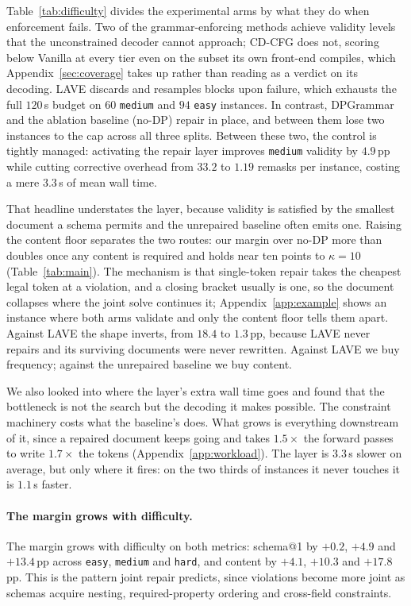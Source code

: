 \documentclass{article}
\begin{document}
Table~\ref{tab:difficulty} divides the experimental arms by what they do when enforcement fails. Two of the grammar-enforcing methods achieve validity levels that the unconstrained decoder cannot approach; CD-CFG does not, scoring below Vanilla at every tier even on the subset its own front-end compiles, which Appendix~\ref{sec:coverage} takes up rather than reading as a verdict on its decoding. LAVE discards and resamples blocks upon failure, which exhausts the full $120$\,s budget on $60$ \texttt{medium} and $94$ \texttt{easy} instances. In contrast, DPGrammar and the ablation baseline (no-DP) repair in place, and between them lose two instances to the cap across all three splits. Between these two, the control is tightly managed: activating the repair layer improves \texttt{medium} validity by $4.9$\,pp while cutting corrective overhead from $33.2$ to $1.19$ remasks per instance, costing a mere $3.3$\,s of mean wall time.

That headline understates the layer, because validity is satisfied by the
smallest document a schema permits and the unrepaired baseline often emits one.
Raising the content floor separates the two routes: our margin over no-DP more
than doubles once any content is required and holds near ten points to
$\kappa{=}10$ (Table~\ref{tab:main}). The mechanism is that single-token repair
takes the cheapest legal token at a violation, and a closing bracket usually is
one, so the document collapses where the joint solve continues it;
Appendix~\ref{app:example} shows an instance where both arms validate and only
the content floor tells them apart. Against LAVE the shape inverts, from
$18.4$ to $1.3$\,pp, because LAVE never repairs and its surviving documents were
never rewritten. Against LAVE we buy frequency; against the unrepaired baseline
we buy content.


We also looked into where the layer's extra wall time goes and found that the
bottleneck is not the search but the decoding it makes possible. The constraint
machinery costs what the baseline's does. What grows is everything downstream of
it, since a repaired document keeps going and takes $1.5\times$ the forward
passes to write $1.7\times$ the tokens (Appendix~\ref{app:workload}). The layer
is $3.3$\,s slower on average, but only where it fires: on the two thirds of
instances it never touches it is $1.1$\,s faster.

\paragraph{The margin grows with difficulty.}
The margin grows with difficulty on both metrics: schema@1 by $+0.2$, $+4.9$ and
$+13.4$\,pp across \texttt{easy}, \texttt{medium} and \texttt{hard}, and content
by $+4.1$, $+10.3$ and $+17.8$\,pp. This is the pattern joint repair predicts,
since violations become more joint as schemas acquire nesting, required-property
ordering and cross-field constraints.
\end{document}
